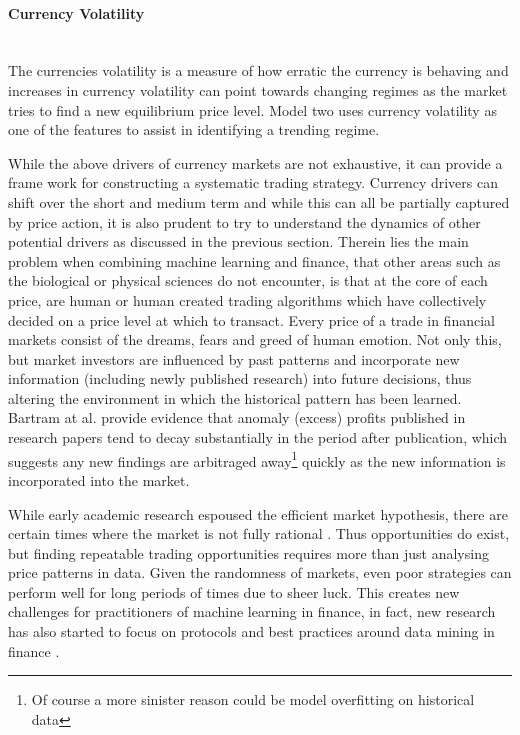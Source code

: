 \documentclass[11pt]{article}
\newcommand{\myparagraph}[1]{\paragraph{#1}\mbox{}\\}
\begin{document}
\myparagraph{Currency Volatility}
The currencies volatility is a measure of how erratic the currency is behaving and increases in currency volatility can point towards changing regimes as the market tries to find a new equilibrium price level. Model two uses currency volatility as one of the features to assist in identifying a trending regime.
\vspace{5mm}

While the above drivers of currency markets are not exhaustive, it can provide a frame work for constructing a systematic trading strategy. Currency drivers can shift over the short and medium term and while this can all be partially captured by price action, it is also prudent to try to understand the dynamics of other potential drivers as discussed in the previous section. \newline
Therein lies the main problem when combining machine learning and finance, that other areas such as the biological or physical sciences do not encounter, is that at the core of each price, are human or human created trading algorithms which have collectively decided on a price level at which to transact. \newline Every price of a trade in financial markets consist of the dreams, fears and greed of human emotion. Not only this, but market investors are influenced by past patterns and incorporate new information (including newly published research) into future decisions, thus altering the environment in which the historical pattern has been learned. Bartram at al. provide evidence that anomaly (excess) profits published in research papers tend to decay substantially in the period after publication, which suggests any new findings are arbitraged away\footnote{Of course a more sinister reason could be model overfitting on historical data} quickly as the new information is incorporated into the market\cite{Bartram2019}. \par

While early academic research espoused the efficient market hypothesis, there are certain times where the market is not fully rational \cite{Dome2008}. Thus opportunities do exist, but finding repeatable trading opportunities requires more than just analysing price patterns in data. Given the randomness of markets, even poor strategies can perform well for long periods of times due to sheer luck. This creates new challenges for practitioners of machine learning in finance, in fact, new research has also started to focus on protocols and best practices around data mining in finance \cite{Arnott2018}.
\end{document}
